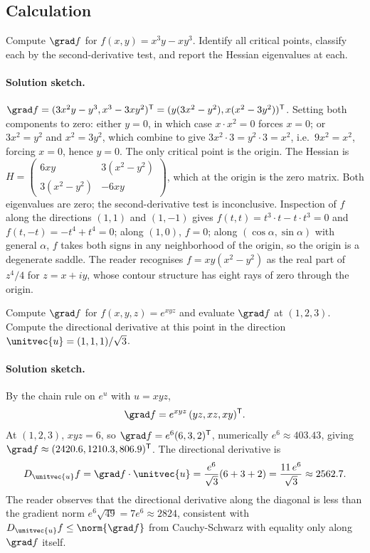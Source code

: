 \subsection*{Calculation}

\begin{exercise}
Compute $\grad f$ for $f(x, y) = x^{3} y - x y^{3}$. Identify all
critical points, classify each by the second-derivative test, and
report the Hessian eigenvalues at each.

\paragraph{Solution sketch.} $\grad f = (3x^{2} y - y^{3},
x^{3} - 3 x y^{2})^{\mathsf{T}} = (y(3x^{2} - y^{2}),
x(x^{2} - 3 y^{2}))^{\mathsf{T}}$. Setting both components to zero:
either $y = 0$, in which case $x \cdot x^{2} = 0$ forces $x = 0$;
or $3 x^{2} = y^{2}$ and $x^{2} = 3 y^{2}$, which combine to give
$3 x^{2} \cdot 3 = y^{2} \cdot 3 = x^{2}$, i.e.\ $9 x^{2} = x^{2}$,
forcing $x = 0$, hence $y = 0$. The only critical point is the
origin. The Hessian is $H = \begin{pmatrix} 6 x y & 3(x^{2} - y^{2})
\\ 3(x^{2} - y^{2}) & -6 x y \end{pmatrix}$, which at the origin
is the zero matrix. Both eigenvalues are zero; the second-derivative
test is inconclusive. Inspection of $f$ along the directions
$(1, 1)$ and $(1, -1)$ gives $f(t, t) = t^{3} \cdot t - t \cdot
t^{3} = 0$ and $f(t, -t) = -t^{4} + t^{4} = 0$; along $(1, 0)$,
$f = 0$; along $(\cos\alpha, \sin\alpha)$ with general $\alpha$,
$f$ takes both signs in any neighborhood of the origin, so the
origin is a degenerate saddle. The reader recognises $f = x y(x^{2}
- y^{2})$ as the real part of $z^{4}/4$ for $z = x + i y$, whose
contour structure has eight rays of zero through the origin.
\end{exercise}

\begin{exercise}
Compute $\grad f$ for $f(x, y, z) = e^{x y z}$ and evaluate
$\grad f$ at $(1, 2, 3)$. Compute the directional derivative at
this point in the direction $\unitvec{u} = (1, 1, 1)/\sqrt{3}$.

\paragraph{Solution sketch.} By the chain rule on $e^{u}$ with
$u = x y z$,
\[
\grad f = e^{x y z}\,(y z, x z, x y)^{\mathsf{T}}.
\]
At $(1, 2, 3)$, $x y z = 6$, so $\grad f = e^{6}(6, 3, 2)^{
\mathsf{T}}$, numerically $e^{6} \approx 403.43$, giving
$\grad f \approx (2420.6, 1210.3, 806.9)^{\mathsf{T}}$. The
directional derivative is
\[
D_{\unitvec{u}} f = \grad f \cdot \unitvec{u} = \frac{e^{6}}{\sqrt{3}}
(6 + 3 + 2) = \frac{11\,e^{6}}{\sqrt{3}} \approx 2562.7.
\]
The reader observes that the directional derivative along the
diagonal is less than the gradient norm $e^{6}\sqrt{49} = 7 e^{6}
\approx 2824$, consistent with $D_{\unitvec{u}} f \leq \norm{\grad
f}$ from Cauchy-Schwarz with equality only along $\grad f$ itself.
\end{exercise}

